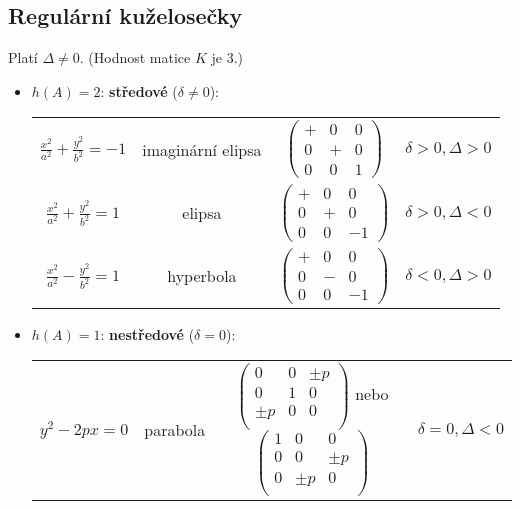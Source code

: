 \subsection{Regulární kuželosečky}
Platí $\Delta \ne 0.$ (Hodnost matice $K$ je 3.)
\begin{itemize}
\item $h(A)=2$: \textbf{středové} ($\delta \ne 0$):
\begin{center}
    \begin{tabular}{c c c c}
        $\frac{x^2}{a^2}+\frac{y^2}{b^2}=-1$ & imaginární elipsa & $\begin{pmatrix}
            + & 0 & 0 \\
            0 & + & 0 \\
            0 & 0 & 1
        \end{pmatrix}$ & $\delta >0, \Delta >0$ \\[1cm]
        $\frac{x^2}{a^2}+\frac{y^2}{b^2}=1$ & elipsa & $\begin{pmatrix}
            + & 0 & 0 \\
            0 & + & 0 \\
            0 & 0 & -1
        \end{pmatrix}$ & $\delta >0, \Delta <0$ \\[1cm]
        $\frac{x^2}{a^2}-\frac{y^2}{b^2}=1$ & hyperbola & $\begin{pmatrix}
            + & 0 & 0 \\
            0 & - & 0 \\
            0 & 0 & -1
        \end{pmatrix}$ & $\delta <0, \Delta >0$
    \end{tabular}
\end{center}
\item $h(A)=1$: \textbf{nestředové} ($\delta = 0$):
\begin{center}
    \begin{tabular}{c c c c}
        $y^2-2px=0$ & parabola & $\begin{pmatrix}
            0 & 0 & \pm p  \\
            0 & 1 & 0 \\
            \pm p  & 0 & 0 \\
        \end{pmatrix}$ nebo $\begin{pmatrix}
            1 & 0 & 0  \\
            0 & 0 & \pm p \\
            0  & \pm p & 0 \\
        \end{pmatrix}$ & $\delta =0, \Delta <0$
    \end{tabular}
\end{center}
\end{itemize}

